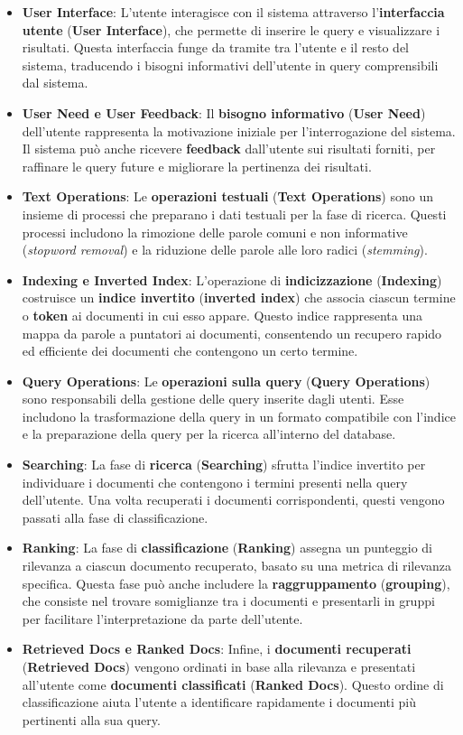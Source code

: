 \documentclass{report}
\begin{document}
	\begin{itemize}
		\item \textbf{User Interface}: L'utente interagisce con il sistema attraverso l'\textbf{interfaccia utente} (\textbf{User Interface}), che permette di inserire le query e visualizzare i risultati. Questa interfaccia funge da tramite tra l'utente e il resto del sistema, traducendo i bisogni informativi dell'utente in query comprensibili dal sistema.
		\item \textbf{User Need e User Feedback}: Il \textbf{bisogno informativo} (\textbf{User Need}) dell'utente rappresenta la motivazione iniziale per l'interrogazione del sistema. Il sistema può anche ricevere \textbf{feedback} dall'utente sui risultati forniti, per raffinare le query future e migliorare la pertinenza dei risultati.
		\item \textbf{Text Operations}: Le \textbf{operazioni testuali} (\textbf{Text Operations}) sono un insieme di processi che preparano i dati testuali per la fase di ricerca. Questi processi includono la rimozione delle parole comuni e non informative (\textit{stopword removal}) e la riduzione delle parole alle loro radici (\textit{stemming}).
		\item \textbf{Indexing e Inverted Index}: L'operazione di \textbf{indicizzazione} (\textbf{Indexing}) costruisce un \textbf{indice invertito} (\textbf{inverted index}) che associa ciascun termine o \textbf{token} ai documenti in cui esso appare. Questo indice rappresenta una mappa da parole a puntatori ai documenti, consentendo un recupero rapido ed efficiente dei documenti che contengono un certo termine.
		\item \textbf{Query Operations}: Le \textbf{operazioni sulla query} (\textbf{Query Operations}) sono responsabili della gestione delle query inserite dagli utenti. Esse includono la trasformazione della query in un formato compatibile con l'indice e la preparazione della query per la ricerca all'interno del database.
		\item \textbf{Searching}: La fase di \textbf{ricerca} (\textbf{Searching}) sfrutta l'indice invertito per individuare i documenti che contengono i termini presenti nella query dell'utente. Una volta recuperati i documenti corrispondenti, questi vengono passati alla fase di classificazione.
		\item \textbf{Ranking}: La fase di \textbf{classificazione} (\textbf{Ranking}) assegna un punteggio di rilevanza a ciascun documento recuperato, basato su una metrica di rilevanza specifica. Questa fase può anche includere la \textbf{raggruppamento} (\textbf{grouping}), che consiste nel trovare somiglianze tra i documenti e presentarli in gruppi per facilitare l'interpretazione da parte dell'utente.
		\item \textbf{Retrieved Docs e Ranked Docs}: Infine, i \textbf{documenti recuperati} (\textbf{Retrieved Docs}) vengono ordinati in base alla rilevanza e presentati all'utente come \textbf{documenti classificati} (\textbf{Ranked Docs}). Questo ordine di classificazione aiuta l'utente a identificare rapidamente i documenti più pertinenti alla sua query.
	\end{itemize}
\end{document}
